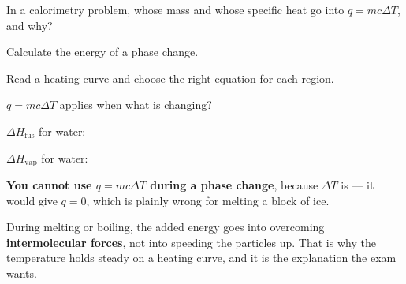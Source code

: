 \documentclass{apchem-notes}
\begin{document}
\begin{exitticket}
In a calorimetry problem, whose mass and whose specific heat go into
$q = mc\Delta T$, and why?
\end{exitticket}


\begin{objectives}
  \item Calculate the energy of a phase change.
  \item Read a heating curve and choose the right equation for each region.
\end{objectives}


\begin{warmup}[3]
  \item $q = mc\Delta T$ applies when what is changing?
  \item $\Delta H_{\text{fus}}$ for water:
  \item $\Delta H_{\text{vap}}$ for water:
\end{warmup}



\begin{center}
\end{center}

\begin{apctrap}
\textbf{You cannot use $q = mc\Delta T$ during a phase change}, because
$\Delta T$ is  --- it would give $q = 0$, which is
plainly wrong for melting a block of ice.

During melting or boiling, the added energy goes into overcoming
\textbf{intermolecular forces}, not into speeding the particles up. That is
why the temperature holds steady on a heating curve, and it is the
explanation the exam wants.
\end{apctrap}
\end{document}
